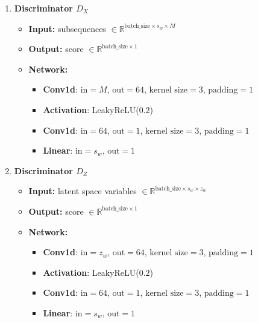 \begin{enumerate}
    \item \textbf{Discriminator $D_X$}
    \begin{itemize}
        \item \textbf{Input:} subsequences $ \in \mathbb{R}^{\text{batch\_size} \times s_w \times M}$
        \item \textbf{Output:} score $ \in \mathbb{R}^{\text{batch\_size} \times 1}$
        \item \textbf{Network:} 
            \begin{itemize}
                \item \textbf{Conv1d}: $\text{in} = M$, $\text{out} = 64$, $\text{kernel size} = 3$, $\text{padding}=1$
                \item \textbf{Activation}: LeakyReLU($0.2$)                
                \item \textbf{Conv1d}: $\text{in} = 64$, $\text{out} = 1$, $\text{kernel size} = 3$, $\text{padding}=1$
                \item \textbf{Linear}: $\text{in} = s_w$, $\text{out} = 1$
            \end{itemize}
    \end{itemize}

    \item \textbf{Discriminator $D_Z$}
    \begin{itemize} 
        \item \textbf{Input:} latent space variables $ \in \mathbb{R}^{\text{batch\_size} \times s_w \times z_w}$
        \item \textbf{Output:} score $ \in \mathbb{R}^{\text{batch\_size} \times 1}$
        \item \textbf{Network:} 
            \begin{itemize}
                \item \textbf{Conv1d}: $\text{in} = z_w$, $\text{out} = 64$, $\text{kernel size} = 3$, $\text{padding}=1$
                \item \textbf{Activation}: LeakyReLU($0.2$)
                \item \textbf{Conv1d}: $\text{in} = 64$, $\text{out} = 1$, $\text{kernel size} = 3$, $\text{padding}=1$
                \item \textbf{Linear}: $\text{in} = s_w$, $\text{out} = 1$
            \end{itemize}
        
    \end{itemize}
\end{enumerate}

